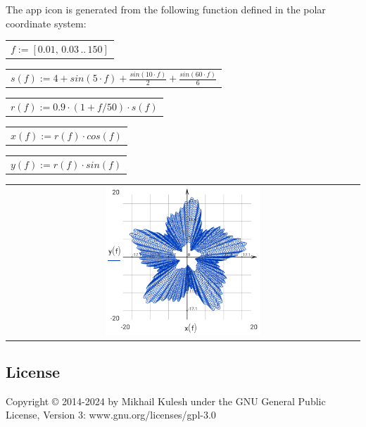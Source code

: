 \documentclass[DIV=calc, paper=a4, fontsize=11pt, twocolumn]{scrartcl}
\begin{document}
The app icon is generated from the
following function defined in the
polar coordinate system:
\begin{center}\begin{tabular}{c}
  $f := \left[ 0.01,\, 0.03 \,..\, 150 \right]$
\end{tabular}\end{center}
\begin{center}\begin{tabular}{c}
  $s(f) := 4 + sin \left( 5 \cdot f\right)  + \frac{sin \left( 10 \cdot f\right) }{2} + \frac{sin \left( 60 \cdot f\right) }{6}$
\end{tabular}\end{center}
\begin{center}\begin{tabular}{c}
  $r(f) := 0.9 \cdot \left( 1 + f / 50 \right) \cdot s \left( f\right) $
\end{tabular}\end{center}
\begin{center}\begin{tabular}{c}
  $x(f) := r \left( f\right)  \cdot cos \left( f\right) $
\end{tabular}\end{center}
\begin{center}\begin{tabular}{c}
  $y(f) := r \left( f\right)  \cdot sin \left( f\right) $
\end{tabular}\end{center}
\begin{center}\begin{tabular}{c} \includegraphics[width=0.45\textwidth]{graphics/about_micromath_fig1.png} \end{tabular}\end{center}

\subsection{License}

Copyright © 2014-2024 by Mikhail Kulesh
under the GNU General Public License,
Version 3:
www.gnu.org/licenses/gpl-3.0
\end{document}
